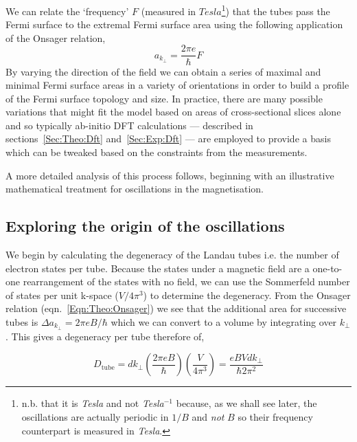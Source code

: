  We can relate the `frequency' $F$ (measured in $Tesla$\footnote{n.b. that it is \emph{Tesla} and not \emph{Tesla$^{-1}$} because, as we shall see later, the oscillations are actually periodic in $1/B$ and \emph{not} $B$ so their frequency counterpart is measured in \emph{Tesla}.}) that the tubes pass the Fermi surface to the extremal Fermi surface area using the following application of the Onsager relation,
\begin{equation}
\textit{a}_{k_{\perp}} = \frac{2\pi e }{\hbar}F
\label{Eqn:Theo:AreaFreqRelation}
\end{equation}
By varying the direction of the field we can obtain a series of maximal and minimal Fermi surface areas in a variety of orientations in order to build a profile of the Fermi surface topology and size. In practice, there are many possible variations that might fit the model based on areas of cross-sectional slices alone and so typically ab-initio \ac{DFT} calculations --- described in sections~\ref{Sec:Theo:Dft} and~\ref{Sec:Exp:Dft} --- are employed to provide a basis which can be tweaked based on the constraints from the measurements. 

A more detailed analysis of this process follows, beginning with an illustrative mathematical treatment for oscillations in the magnetisation.

\subsection{Exploring the origin of the oscillations}
    \label{Sec:Theo:ToyEqn}

We begin by calculating the degeneracy of the Landau tubes i.e. the number of electron states per tube. Because the states under a magnetic field are a one-to-one rearrangement of the states with no field, we can use the Sommerfeld number of states per unit k-space ($V/4\pi^3$) to determine the degeneracy. From the Onsager relation (eqn.~\ref{Eqn:Theo:Onsager}) we see that the additional area for successive tubes is $\Delta a_{k_{\perp}}  = 2\pi e B/\hbar$ which we can convert to a volume by integrating over $k_{\perp}$. This gives a degeneracy per tube therefore of,

\begin{equation}
D_{\textrm{tube}} = d k_{\perp}\left(\frac{2\pi e B}{\hbar}\right)\left(\frac{V}{4 \pi^3}\right) = \frac{eBVdk_{\perp}}{\hbar 2\pi^2}
\end{equation}

